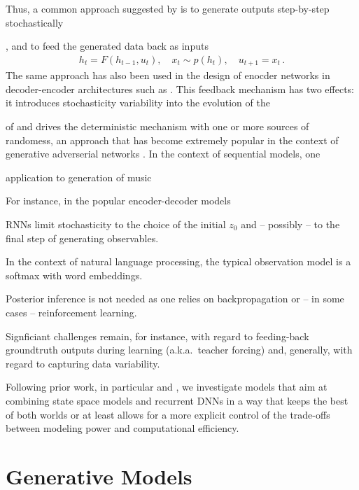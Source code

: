 \documentclass[a4paper,10pt]{article}
\begin{document}
Thus, a common approach suggested by \cite{graves2013generating} is to generate outputs step-by-step stochastically


, and to feed the generated data back as inputs
\begin{align}
h_{t} = F(h_{t-1},u_{t}), \quad  x_t  \sim p(h_t), \quad u_{t+1} = x_t  \,. 
\end{align}
The same approach has also been used in the design of enocder networks in decoder-encoder architectures such as \cite{sutskever2014sequence}. This feedback mechanism has two effects: it introduces stochasticity variability into the evolution of the 



\newpage

of \cite{mackay1995bayesian} and drives the deterministic mechanism with one or more sources of randomess, an approach that has become extremely popular in the context of generative adverserial networks \cite{goodfellow2014generative}. In the context of sequential models, one 

application to generation of music \cite{eck2002first,boulanger2012modeling}

\newpage

For instance, in the popular encoder-decoder models 

RNNs limit stochasticity to the choice of the initial $z_0$ and -- possibly -- to the final step of generating observables.


 In the context of natural language processing, the typical observation model is a softmax with word embeddings. 



\newpage

Posterior inference is not needed as one relies  on  backpropagation or -- in some cases -- reinforcement learning. 

Signficiant challenges remain, for instance, with regard to feeding-back groundtruth outputs during learning (a.k.a.~teacher forcing) and, generally, with regard to capturing data variability. 

Following prior work, in particular \cite{chung2015recurrent} and  \cite{fraccaro2016sequential}, we investigate models that aim at combining state space models and recurrent DNNs in a way that keeps the best of both worlds or at least allows for a more explicit control of the trade-offs between modeling power and computational efficiency. 

\section{Generative Models}
\end{document}
